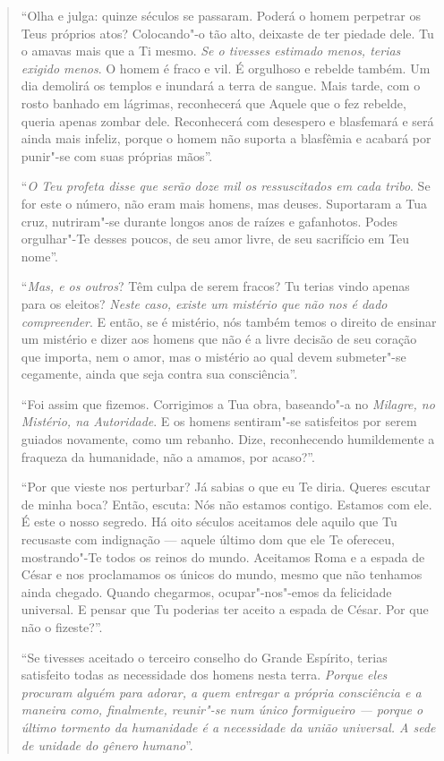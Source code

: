 \begin{quote}
``Olha e julga: quinze séculos se passaram. Poderá o homem perpetrar os
Teus próprios atos? Colocando"-o tão alto, deixaste de ter piedade dele.
Tu o amavas mais que a Ti mesmo. \emph{Se o tivesses estimado menos,
terias exigido menos}. O homem é fraco e vil. É orgulhoso e rebelde
também. Um dia demolirá os templos e inundará a terra de sangue. Mais
tarde, com o rosto banhado em lágrimas, reconhecerá que Aquele que o fez
rebelde, queria apenas zombar dele. Reconhecerá com desespero e
blasfemará e será ainda mais infeliz, porque o homem não suporta a
blasfêmia e acabará por punir"-se com suas próprias mãos''.

``\emph{O Teu profeta disse que serão doze mil os ressuscitados em
cada tribo}. Se for este o número, não eram mais homens, mas deuses.
Suportaram a Tua cruz, nutriram"-se durante longos anos de raízes e
gafanhotos. Podes orgulhar"-Te desses poucos, de seu amor livre, de seu
sacrifício em Teu nome''.

``\emph{Mas, e os outros}? Têm culpa de serem fracos? Tu terias vindo
apenas para os eleitos? \emph{Neste caso, existe um mistério que não
nos é dado compreender}. E então, se é mistério, nós também temos o
direito de ensinar um mistério e dizer aos homens que não é a livre
decisão de seu coração que importa, nem o amor, mas o mistério ao qual
devem submeter"-se cegamente, ainda que seja contra sua consciência''.

``Foi assim que fizemos. Corrigimos a Tua obra, baseando"-a no
\emph{Milagre, no Mistério, na Autoridade}. E os homens
sentiram"-se satisfeitos por serem guiados novamente, como um rebanho.
Dize, reconhecendo humildemente a fraqueza da humanidade, não a amamos,
por acaso?''.

``Por que vieste nos perturbar? Já sabias o que eu Te diria. Queres
escutar de minha boca? Então, escuta:
Nós não estamos contigo. Estamos com ele. É este o nosso segredo. Há
oito séculos aceitamos dele aquilo que Tu recusaste com indignação ---
aquele último dom que ele Te ofereceu, mostrando"-Te todos os reinos do
mundo. Aceitamos Roma e a espada de César e nos proclamamos os únicos
do mundo, mesmo que não tenhamos ainda chegado. Quando chegarmos,
ocupar"-nos"-emos da felicidade universal. E pensar que Tu poderias ter
aceito a espada de César. Por que não o fizeste?''.

``Se tivesses aceitado o terceiro conselho do Grande Espírito, terias
satisfeito todas as necessidade dos homens nesta terra. \emph{Porque
eles procuram alguém para adorar, a quem entregar a própria consciência
e a maneira como, finalmente, reunir"-se num único formigueiro --- porque
o último tormento da humanidade é a necessidade da união universal. A
sede de unidade do gênero humano}''.


\end{quote}
